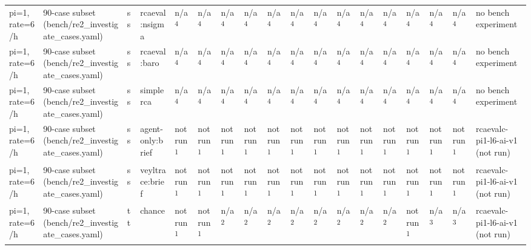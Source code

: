 \begin{table}[t]
\begin{tabular}{llllllllllllllllll}
pi=1, rate=6/h & 90-case subset (bench/re2\_investigate\_cases.yaml) & ss & rcaeval:nsigma & n/a\textsuperscript{4} & n/a\textsuperscript{4} & n/a\textsuperscript{4} & n/a\textsuperscript{4} & n/a\textsuperscript{4} & n/a\textsuperscript{4} & n/a\textsuperscript{4} & n/a\textsuperscript{4} & n/a\textsuperscript{4} & n/a\textsuperscript{4} & n/a\textsuperscript{4} & n/a\textsuperscript{4} & n/a\textsuperscript{4} & no bench experiment \\
pi=1, rate=6/h & 90-case subset (bench/re2\_investigate\_cases.yaml) & ss & rcaeval:baro & n/a\textsuperscript{4} & n/a\textsuperscript{4} & n/a\textsuperscript{4} & n/a\textsuperscript{4} & n/a\textsuperscript{4} & n/a\textsuperscript{4} & n/a\textsuperscript{4} & n/a\textsuperscript{4} & n/a\textsuperscript{4} & n/a\textsuperscript{4} & n/a\textsuperscript{4} & n/a\textsuperscript{4} & n/a\textsuperscript{4} & no bench experiment \\
pi=1, rate=6/h & 90-case subset (bench/re2\_investigate\_cases.yaml) & ss & simplerca & n/a\textsuperscript{4} & n/a\textsuperscript{4} & n/a\textsuperscript{4} & n/a\textsuperscript{4} & n/a\textsuperscript{4} & n/a\textsuperscript{4} & n/a\textsuperscript{4} & n/a\textsuperscript{4} & n/a\textsuperscript{4} & n/a\textsuperscript{4} & n/a\textsuperscript{4} & n/a\textsuperscript{4} & n/a\textsuperscript{4} & no bench experiment \\
pi=1, rate=6/h & 90-case subset (bench/re2\_investigate\_cases.yaml) & ss & agent-only:brief & not run\textsuperscript{1} & not run\textsuperscript{1} & not run\textsuperscript{1} & not run\textsuperscript{1} & not run\textsuperscript{1} & not run\textsuperscript{1} & not run\textsuperscript{1} & not run\textsuperscript{1} & not run\textsuperscript{1} & not run\textsuperscript{1} & not run\textsuperscript{1} & not run\textsuperscript{1} & not run\textsuperscript{1} & rcaevalc-pi1-l6-ai-v1 (not run) \\
pi=1, rate=6/h & 90-case subset (bench/re2\_investigate\_cases.yaml) & ss & veyltrace:brief & not run\textsuperscript{1} & not run\textsuperscript{1} & not run\textsuperscript{1} & not run\textsuperscript{1} & not run\textsuperscript{1} & not run\textsuperscript{1} & not run\textsuperscript{1} & not run\textsuperscript{1} & not run\textsuperscript{1} & not run\textsuperscript{1} & not run\textsuperscript{1} & not run\textsuperscript{1} & not run\textsuperscript{1} & rcaevalc-pi1-l6-ai-v1 (not run) \\
pi=1, rate=6/h & 90-case subset (bench/re2\_investigate\_cases.yaml) & tt & chance & not run\textsuperscript{1} & not run\textsuperscript{1} & n/a\textsuperscript{2} & n/a\textsuperscript{2} & n/a\textsuperscript{2} & n/a\textsuperscript{2} & n/a\textsuperscript{2} & n/a\textsuperscript{2} & n/a\textsuperscript{2} & n/a\textsuperscript{2} & not run\textsuperscript{1} & n/a\textsuperscript{3} & n/a\textsuperscript{3} & rcaevalc-pi1-l6-ai-v1 (not run) \\

\end{tabular}
\end{table}

